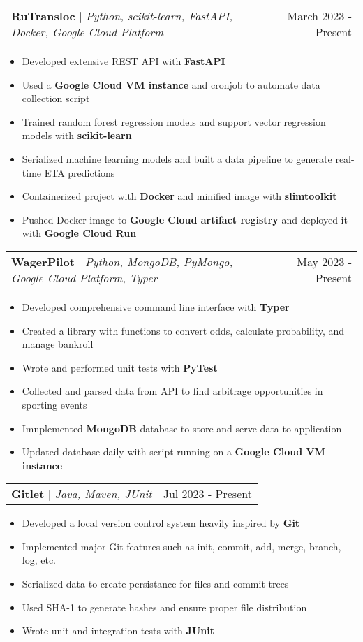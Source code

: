 \documentclass[letterpaper,11pt]{article}
\makeatletter
\newcommand{\resumeItem}[1]{
  \item\small{
    {#1 \vspace{-2pt}}
  }
}
\newcommand{\resumeProjectHeading}[2]{
    \item
    \begin{tabular*}{0.97\textwidth}{l@{\extracolsep{\fill}}r}
      \small#1 & #2 \\
    \end{tabular*}\vspace{-7pt}
}
\newcommand{\resumeItemListStart}{\begin{itemize}}
\newcommand{\resumeItemListEnd}{\end{itemize}\vspace{-5pt}}
\makeatother
\begin{document}
        \resumeProjectHeading
            {\textbf{RuTransloc} $|$ \emph{Python, scikit-learn, FastAPI, Docker, Google Cloud Platform}}{March 2023 - Present}
            \resumeItemListStart
                \resumeItem{Developed extensive REST API with \textbf{FastAPI}}
                \resumeItem{Used a \textbf{Google Cloud VM instance} and cronjob to automate data collection script}
                \resumeItem{Trained random forest regression models and support vector regression models with \textbf{scikit-learn}}
                \resumeItem{Serialized machine learning models and built a data pipeline to generate real-time ETA predictions}
                \resumeItem{Containerized project with \textbf{Docker} and minified image with \textbf{slimtoolkit}}
                \resumeItem{Pushed Docker image to \textbf{Google Cloud artifact registry} and deployed it with \textbf{Google Cloud Run}}
            \resumeItemListEnd
        \resumeProjectHeading
            {\textbf{WagerPilot} $|$ \emph{Python, MongoDB, PyMongo, Google Cloud Platform, Typer}}{May 2023 - Present}
            \resumeItemListStart
                \resumeItem{Developed comprehensive command line interface with \textbf{Typer}}
                \resumeItem{Created a library with functions to convert odds, calculate probability, and manage bankroll}
                \resumeItem{Wrote and performed unit tests with \textbf{PyTest}}
                \resumeItem{Collected and parsed data from API to find arbitrage opportunities in sporting events}
                \resumeItem{Imnplemented \textbf{MongoDB} database to store and serve data to application}
                \resumeItem{Updated database daily with script running on a \textbf{Google Cloud VM instance}}
            \resumeItemListEnd
        \resumeProjectHeading
            {\textbf{Gitlet} $|$ \emph{Java, Maven, JUnit}}{Jul 2023 - Present}
            \resumeItemListStart
                \resumeItem{Developed a local version control system heavily inspired by \textbf{Git}}
                \resumeItem{Implemented major Git features such as init, commit, add, merge, branch, log, etc.}
                \resumeItem{Serialized data to create persistance for files and commit trees}
                \resumeItem{Used SHA-1 to generate hashes and ensure proper file distribution}
                \resumeItem{Wrote unit and integration tests with \textbf{JUnit}}
            \resumeItemListEnd

    
\end{document}
